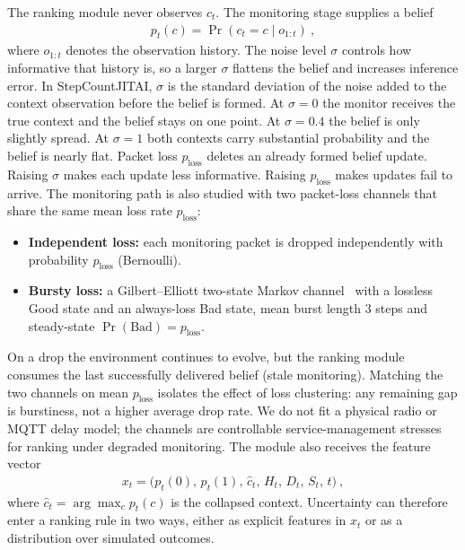 \documentclass[journal]{IEEEtran}
\begin{document}
The ranking module never observes \(c_t\).
The monitoring stage supplies a belief
\begin{align}
\label{eq:belief}
p_t(c)=\Pr\!\left(c_t=c \mid o_{1:t}\right)\:,
\end{align}
where \(o_{1:t}\) denotes the observation history.
The noise level \(\sigma\) controls how informative that history is, so a larger \(\sigma\) flattens the belief and increases inference error.
In StepCountJITAI, \(\sigma\) is the standard deviation of the noise added to the context observation before the belief is formed. At \(\sigma=0\) the monitor receives the true context and the belief stays on one point. At \(\sigma=0.4\) the belief is only slightly spread. At \(\sigma=1\) both contexts carry substantial probability and the belief is nearly flat. Packet loss \(p_{\mathrm{loss}}\) deletes an already formed belief update. Raising \(\sigma\) makes each update less informative. Raising \(p_{\mathrm{loss}}\) makes updates fail to arrive.
The monitoring path is also studied with two packet-loss channels that share the same mean loss rate \(p_{\mathrm{loss}}\):
\begin{itemize}
  \item \textbf{Independent loss:} each monitoring packet is dropped independently with probability \(p_{\mathrm{loss}}\) (Bernoulli).
  \item \textbf{Bursty loss:} a Gilbert--Elliott two-state Markov channel~\cite{gilbert1960capacity,elliott1963estimates} with a lossless Good state and an always-loss Bad state, mean burst length \(3\) steps and steady-state \(\Pr(\mathrm{Bad})=p_{\mathrm{loss}}\).
\end{itemize}
On a drop the environment continues to evolve, but the ranking module consumes the last successfully delivered belief (stale monitoring).
Matching the two channels on mean \(p_{\mathrm{loss}}\) isolates the effect of loss clustering: any remaining gap is burstiness, not a higher average drop rate.
We do not fit a physical radio or MQTT delay model; the channels are controllable service-management stresses for ranking under degraded monitoring.
The module also receives the feature vector
\begin{align}
\label{eq:features}
x_t=\big(p_t(0),\,p_t(1),\,\hat{c}_t,\,H_t,\,D_t,\,S_t,\,t\big)\:,
\end{align}
where \(\hat{c}_t=\arg\max_{c} p_t(c)\) is the collapsed context.
Uncertainty can therefore enter a ranking rule in two ways, either as explicit features in \(x_t\) or as a distribution over simulated outcomes.
\end{document}
